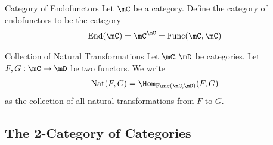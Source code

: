 \documentclass[a4paper]{article}
\begin{document}
\begin{defn}{Category of Endofunctors}{} Let $\mC$ be a category. Define the category of endofunctors to be the category $$\text{End}(\mC)=\mC^\mC=\text{Func}(\mC,\mC)$$
\end{defn}

\begin{defn}{Collection of Natural Transformations}{} Let $\mC,\mD$ be categories. Let $F,G:\mC\to\mD$ be two functors. We write $$\text{Nat}(F,G)=\Hom_{\text{Func}(\mC,\mD)}(F,G)$$ as the collection of all natural transformations from $F$ to $G$. 
\end{defn}

\subsection{The 2-Category of Categories}
\end{document}
